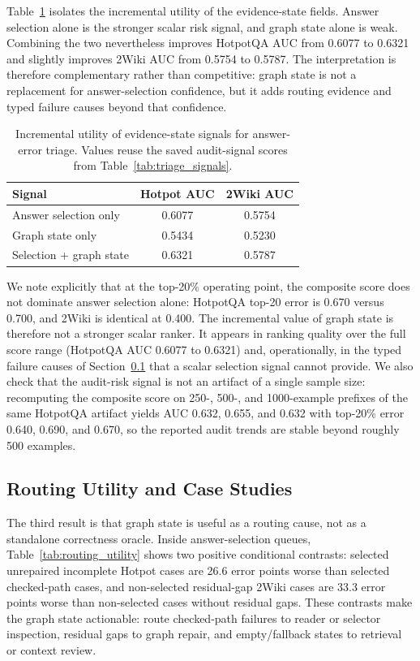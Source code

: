 \documentclass[runningheads,a4paper]{llncs}
\begin{document}
Table~\ref{tab:incremental_signals} isolates the incremental utility of the
evidence-state fields. Answer selection alone is the stronger scalar risk
signal, and graph state alone is weak. Combining the two nevertheless improves
HotpotQA AUC from 0.6077 to 0.6321 and slightly improves 2Wiki AUC from 0.5754
to 0.5787. The interpretation is therefore complementary rather than
competitive: graph state is not a replacement for answer-selection confidence,
but it adds routing evidence and typed failure causes beyond that confidence.

\begin{table}[!htbp]
\centering
\caption{Incremental utility of evidence-state signals for answer-error
triage. Values reuse the saved audit-signal scores from
Table~\ref{tab:triage_signals}.}
\label{tab:incremental_signals}
\scriptsize
\setlength{\tabcolsep}{5.0pt}
\begin{tabular}{lcc}
\toprule
Signal & Hotpot AUC & 2Wiki AUC \\
\midrule
Answer selection only & 0.6077 & 0.5754 \\
Graph state only & 0.5434 & 0.5230 \\
Selection + graph state & 0.6321 & 0.5787 \\
\bottomrule
\end{tabular}
\end{table}

We note explicitly that at the top-20\% operating point, the composite score does
not dominate answer selection alone: HotpotQA top-20 error is 0.670 versus 0.700,
and 2Wiki is identical at 0.400. The incremental value of graph state is
therefore not a stronger scalar ranker. It appears in ranking quality over the
full score range (HotpotQA AUC 0.6077 to 0.6321) and, operationally, in the
typed failure causes of Section~\ref{sec:routing_cases} that a scalar selection signal
cannot provide. We also check that the audit-risk signal is not an artifact of a
single sample size: recomputing the composite score on 250-, 500-, and
1000-example prefixes of the same HotpotQA artifact yields AUC 0.632, 0.655,
and 0.632 with top-20\% error 0.640, 0.690, and 0.670, so the reported audit
trends are stable beyond roughly 500 examples.

\subsection{Routing Utility and Case Studies}
\label{sec:routing_cases}

The third result is that graph state is useful as a routing cause, not as a
standalone correctness oracle. Inside answer-selection queues,
Table~\ref{tab:routing_utility} shows two positive conditional contrasts:
selected unrepaired incomplete Hotpot cases are 26.6 error points worse than
selected checked-path cases, and non-selected residual-gap 2Wiki cases are 33.3
error points worse than non-selected cases without residual gaps. These
contrasts make the graph state actionable: route checked-path failures to reader
or selector inspection, residual gaps to graph repair, and empty/fallback states
to retrieval or context review.
\end{document}
